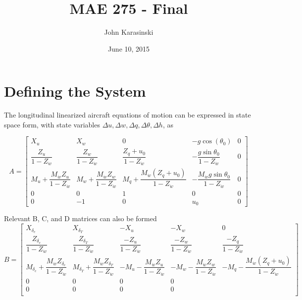\documentclass[12pt]{article}
\title{MAE 275 - Final}
\author{John Karasinski}
\date{June 10, 2015}
\begin{document}
\maketitle

\section{Defining the System}
The longitudinal linearized aircraft equations of motion can be expressed in state space form, with state variables $\Delta u, \Delta w, \Delta q, \Delta \theta, \Delta h$, as

\begin{equation*}
A =
\begin{bmatrix}
    X_u & X_w & 0 & -g \cos(\theta_0) & 0 \\
    \dfrac{Z_u}{1-Z_{\dot{w}}} & \dfrac{Z_w}{1-Z_{\dot{w}}} & \dfrac{Z_q + u_0}{1-Z_{\dot{w}}} & -\dfrac{g\sin \theta_0}{1-Z_{\dot{w}}} & 0 \\
    M_u + \dfrac{M_{\dot{w}} Z_u}{1-Z_{\dot{w}}} & M_w + \dfrac{M_{\dot{w}} Z_w}{1-Z_{\dot{w}}} & M_q + \dfrac{M_{\dot{w}} (Z_q + u_0)}{1-Z_{\dot{w}}} & -\dfrac{M_{\dot{w}} g\sin \theta_0}{1-Z_{\dot{w}}} & 0 \\
    0 & 0 & 1 & 0 & 0 \\
    0 & -1 & 0 & u_0 & 0
\end{bmatrix}
\end{equation*}

\noindent Relevant B, C, and D matrices can also be formed
\begin{equation*}
B =
\begin{bmatrix}
X_{\delta_e}                                                   & X_{\delta_T}                                                   & -X_u                                          & -X_w                                          & 0                                                    \\
\dfrac{Z_{\delta_e}}{1-Z_{\dot{w}}}                            & \dfrac{Z_{\delta_T}}{1-Z_{\dot{w}}}                            & \dfrac{-Z_u}{1-Z_{\dot{w}}}                   & \dfrac{-Z_w}{1-Z_{\dot{w}}}                   & \dfrac{-Z_q}{1-Z_{\dot{w}}}                          \\
M_{\delta_e} + \dfrac{M_{\dot{w}} Z_{\delta_e}}{1-Z_{\dot{w}}} & M_{\delta_T} + \dfrac{M_{\dot{w}} Z_{\delta_T}}{1-Z_{\dot{w}}} & -M_u - \dfrac{M_{\dot{w}} Z_u}{1-Z_{\dot{w}}} & -M_w - \dfrac{M_{\dot{w}} Z_w}{1-Z_{\dot{w}}} & -M_q -\dfrac{M_{\dot{w}} (Z_q + u_0)}{1-Z_{\dot{w}}} \\
    0   &  0   &  0   & 0 \\
    0   &  0   &  0   & 0 \\
\end{bmatrix}
\end{equation*}
\end{document}
